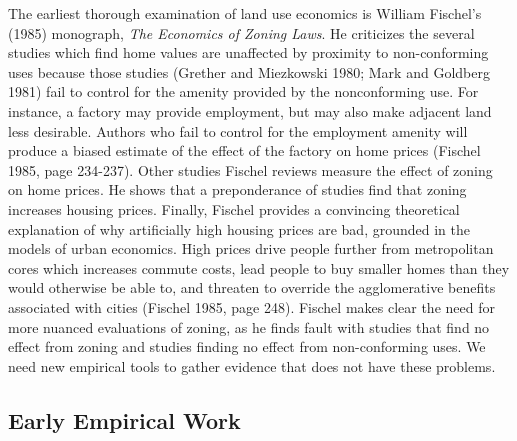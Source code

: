 \documentclass[11pt]{article}
\begin{document}
The earliest thorough examination of land use economics is William Fischel’s (1985) monograph, \textit{The Economics of Zoning Laws}. He criticizes the several studies which find home values are unaffected by proximity to non-conforming uses because those studies (Grether and Miezkowski 1980; Mark and Goldberg 1981) fail to control for the amenity provided by the nonconforming use. For instance, a factory may provide employment, but may also make adjacent land less desirable. Authors who fail to control for the employment amenity will produce a biased estimate of the effect of the factory on home prices (Fischel 1985, page 234-237). Other studies Fischel reviews measure the effect of zoning on home prices. He shows that a preponderance of studies find that zoning increases housing prices. Finally, Fischel provides a convincing theoretical explanation of why artificially high housing prices are bad, grounded in the models of urban economics. High prices drive people further from metropolitan cores which increases commute costs, lead people to buy smaller homes than they would otherwise be able to, and threaten to override the agglomerative benefits associated with cities (Fischel 1985, page 248). Fischel makes clear the need for more nuanced evaluations of zoning, as he finds fault with studies that find no effect from zoning and studies finding no effect from non-conforming uses. We need new empirical tools to gather evidence that does not have these problems.

\subsection{Early Empirical Work}
\end{document}
